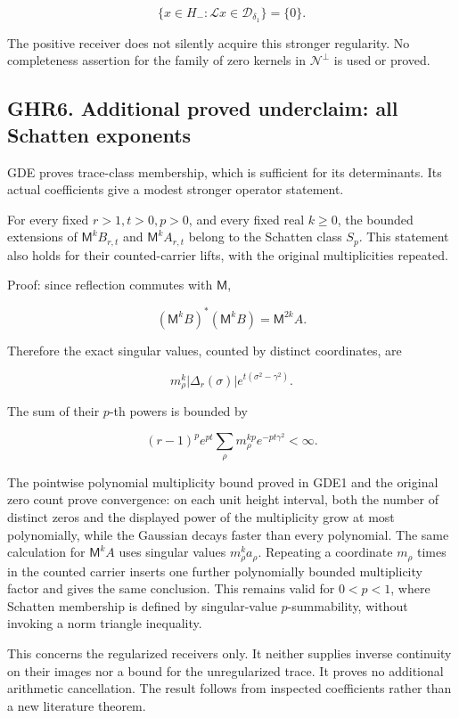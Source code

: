 \documentclass[
]{article}
\begin{document}
\[
\{x\in H_-:\mathcal Lx\in\mathcal D_{\delta_1}\}=\{0\}.
\]

The positive receiver does not silently acquire this stronger regularity. No completeness assertion for the family of zero kernels in \(\mathcal N^\perp\) is used or proved.

\subsection{GHR6. Additional proved underclaim: all Schatten exponents}\label{ghr6.-additional-proved-underclaim-all-schatten-exponents}

GDE proves trace-class membership, which is sufficient for its determinants. Its actual coefficients give a modest stronger operator statement.

For every fixed \(r>1,t>0,p>0\), and every fixed real \(k\ge0\), the bounded extensions of \(\mathsf M^kB_{r,t}\) and \(\mathsf M^kA_{r,t}\) belong to the Schatten class \(S_p\). This statement also holds for their counted-carrier lifts, with the original multiplicities repeated.

Proof: since reflection commutes with \(\mathsf M\),

\[
(\mathsf M^kB)^*(\mathsf M^kB)=\mathsf M^{2k}A.
\]

Therefore the exact singular values, counted by distinct coordinates, are

\[
m_\rho^k|\Delta_r(\sigma)|e^{t(\sigma^2-\gamma^2)}.
\]

The sum of their \(p\)-th powers is bounded by

\[
(r-1)^pe^{pt}
\sum_\rho m_\rho^{kp}e^{-pt\gamma^2}<\infty.
\]

The pointwise polynomial multiplicity bound proved in GDE1 and the original zero count prove convergence: on each unit height interval, both the number of distinct zeros and the displayed power of the multiplicity grow at most polynomially, while the Gaussian decays faster than every polynomial. The same calculation for \(\mathsf M^kA\) uses singular values \(m_\rho^ka_\rho\). Repeating a coordinate \(m_\rho\) times in the counted carrier inserts one further polynomially bounded multiplicity factor and gives the same conclusion. This remains valid for \(0<p<1\), where Schatten membership is defined by singular-value \(p\)-summability, without invoking a norm triangle inequality.

This concerns the regularized receivers only. It neither supplies inverse continuity on their images nor a bound for the unregularized trace. It proves no additional arithmetic cancellation. The result follows from inspected coefficients rather than a new literature theorem.
\end{document}
